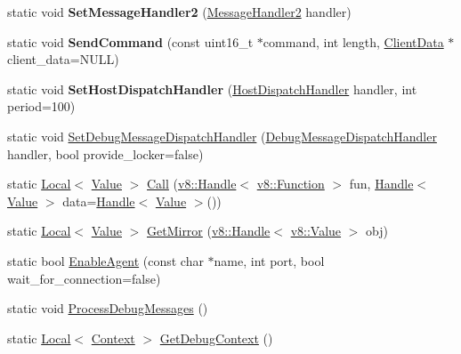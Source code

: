 \begin{DoxyCompactItemize}
\item 
\hypertarget{classv8_1_1_debug_a0375563b2a1e0b4ea5f70a742209bb3f}{}static void {\bfseries Set\+Message\+Handler2} (\hyperlink{classv8_1_1_debug_a0fb8f7e1f8fa47cb23f7ad72cd533c77}{Message\+Handler2} handler)\label{classv8_1_1_debug_a0375563b2a1e0b4ea5f70a742209bb3f}

\item 
\hypertarget{classv8_1_1_debug_a2b221598c358e7e72d7801a74a69fb14}{}static void {\bfseries Send\+Command} (const uint16\+\_\+t $\ast$command, int length, \hyperlink{classv8_1_1_debug_1_1_client_data}{Client\+Data} $\ast$client\+\_\+data=N\+U\+L\+L)\label{classv8_1_1_debug_a2b221598c358e7e72d7801a74a69fb14}

\item 
\hypertarget{classv8_1_1_debug_aa55c29d5cc7b04c4fc24cd89c77f3f54}{}static void {\bfseries Set\+Host\+Dispatch\+Handler} (\hyperlink{classv8_1_1_debug_a442f686afe7d80928b57b3ff8ac3f6e7}{Host\+Dispatch\+Handler} handler, int period=100)\label{classv8_1_1_debug_aa55c29d5cc7b04c4fc24cd89c77f3f54}

\item 
static void \hyperlink{classv8_1_1_debug_a5147f6cfeb9b87a67630b8c959996e9c}{Set\+Debug\+Message\+Dispatch\+Handler} (\hyperlink{classv8_1_1_debug_a91cd8aa9743e3478bc63fe73abcd557c}{Debug\+Message\+Dispatch\+Handler} handler, bool provide\+\_\+locker=false)
\item 
static \hyperlink{classv8_1_1_local}{Local}$<$ \hyperlink{classv8_1_1_value}{Value} $>$ \hyperlink{classv8_1_1_debug_a49a3e0cf585cfd201d8ab1bc395d0593}{Call} (\hyperlink{classv8_1_1_handle}{v8\+::\+Handle}$<$ \hyperlink{classv8_1_1_function}{v8\+::\+Function} $>$ fun, \hyperlink{classv8_1_1_handle}{Handle}$<$ \hyperlink{classv8_1_1_value}{Value} $>$ data=\hyperlink{classv8_1_1_handle}{Handle}$<$ \hyperlink{classv8_1_1_value}{Value} $>$())
\item 
static \hyperlink{classv8_1_1_local}{Local}$<$ \hyperlink{classv8_1_1_value}{Value} $>$ \hyperlink{classv8_1_1_debug_aa7d07c7d5c9ee2eaaa9af310bcbf58f5}{Get\+Mirror} (\hyperlink{classv8_1_1_handle}{v8\+::\+Handle}$<$ \hyperlink{classv8_1_1_value}{v8\+::\+Value} $>$ obj)
\item 
static bool \hyperlink{classv8_1_1_debug_a78506e80b599010624c5fcde72a643a7}{Enable\+Agent} (const char $\ast$name, int port, bool wait\+\_\+for\+\_\+connection=false)
\item 
static void \hyperlink{classv8_1_1_debug_a888e06766caee0380c6aa010b00e1a54}{Process\+Debug\+Messages} ()
\item 
static \hyperlink{classv8_1_1_local}{Local}$<$ \hyperlink{classv8_1_1_context}{Context} $>$ \hyperlink{classv8_1_1_debug_a2343a321b0db41324b7e8a7402f57cf0}{Get\+Debug\+Context} ()
\end{DoxyCompactItemize}


